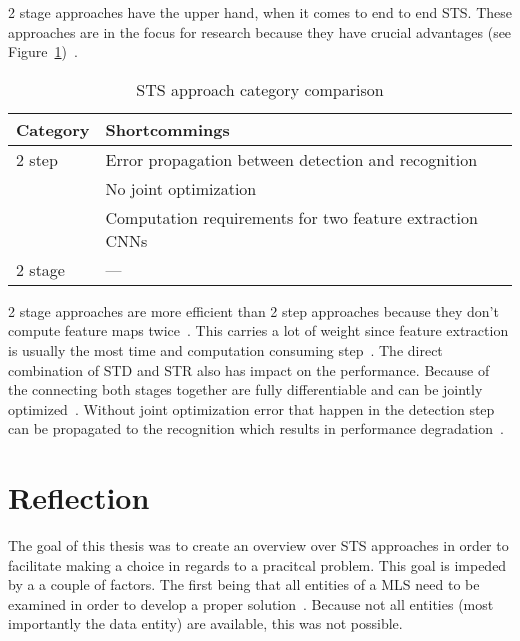 2 stage approaches have the upper hand, when it comes to end to end \ac{STS}.
These approaches are in the focus for research because they have crucial
advantages (see Figure~\ref{tb:E2E-comparison})~\citep{chen_text_2021}.
\begin{table}[h]
    \centering\scriptsize%
    \begin{tabular}{p{}p{}}
        \textbf{Category} & \textbf{Shortcommings} \\
        \toprule
        2 step & Error propagation between detection and
            recognition~\citep{chen_text_2021,long_scene_2021}\\
        & No joint optimization~\citep{qiao_text_2021, chen_text_2021}\\
        & Computation requirements for two feature extraction
            CNNs~\citep{liu_fots_2018,chen_text_2021} \\
        2 stage & --- \\
        \bottomrule
    \end{tabular}
    \caption{STS approach category comparison\label{tb:E2E-comparison}}
\end{table}
2 stage approaches are more efficient than 2 step approaches because they don't compute feature maps
twice~\citep{liu_fots_2018,chen_text_2021}.
This carries a lot of weight since feature extraction is usually the most time and computation
consuming step~\citep{liu_fots_2018}.
The direct combination of \ac{STD} and \ac{STR} also has impact on the performance.
Because of the connecting both stages together are fully differentiable and can be jointly
optimized~\citep{chen_text_2021,long_scene_2021,qiao_text_2021}.
Without joint optimization error that happen in the detection step can be propagated to the
recognition which results in performance degradation~\citep{chen_text_2021,qiao_text_2021}.

\section{Reflection}
The goal of this thesis was to create an overview over \ac{STS} approaches in order to facilitate
making a choice in regards to a pracitcal problem.
This goal is impeded by a a couple of factors.
The first being that all entities of a \ac{MLS} need to be examined in order to develop a proper
solution~\citep{siebert_construction_2021,nakamichi_requirements-driven_2020}.
Because not all entities (most importantly the data entity) are available, this was not possible.

